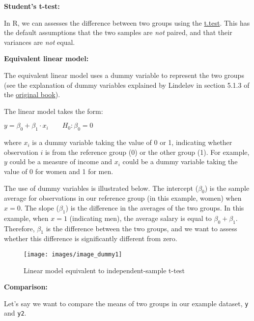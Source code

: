 \documentclass[
  12pt,
]{krantz}
\begin{document}
\textbf{Student's t-test:}

In R, we can assesses the difference between two groups using the \href{https://www.rdocumentation.org/packages/stats/versions/3.5.3/topics/t.test}{t.test}. This has the default assumptions that the two samples are \emph{not} paired, and that their variances are \emph{not} equal.

\textbf{Equivalent linear model:}

The equivalent linear model uses a dummy variable to represent the two groups (see the explanation of dummy variables explained by Lindeløv in section 5.1.3 of the \href{https://lindeloev.github.io/tests-as-linear/\#51_independent_t-test_and_mann-whitney_u}{original book}).

The linear model takes the form:

\begin{center}

\(y = \beta_0 + \beta_1 \cdot x_i \qquad H_0: \beta_0 = 0\)

\end{center}

where \(x_i\) is a dummy variable taking the value of 0 or 1, indicating whether observation \(i\) is from the reference group (0) or the other group (1). For example, \(y\) could be a measure of income and \(x_i\) could be a dummy variable taking the value of 0 for women and 1 for men.

The use of dummy variables is illustrated below. The intercept (\(\beta_0\)) is the sample average for observations in our reference group (in this example, women) when \(x = 0\). The slope (\(\beta_1\)) is the difference in the averages of the two groups. In this example, when \(x = 1\) (indicating men), the average salary is equal to \(\beta_0 + \beta_1\). Therefore, \(\beta_1\) is the difference between the two groups, and we want to assess whether this difference is significantly different from zero.

\begin{figure}

{\centering \texttt{[image: images/image\_dummy1]} 

}

\caption{Linear model equivalent to independent-sample t-test}\label{fig:dummy2}
\end{figure}

\textbf{Comparison:}

Let's say we want to compare the means of two groups in our example dataset, \texttt{y} and \texttt{y2}.
\end{document}
